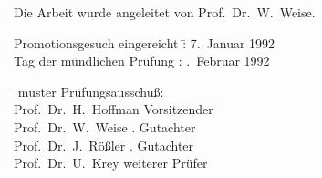 \vspace*{13cm}
Die Arbeit wurde angeleitet von Prof.~Dr.~W.~Weise.
\begin{tabbing}
Promotionsgesuch eingereicht   \= : \= 7.~Januar 1992\\
Tag der m\"undlichen Pr\"ufung \> : .~Februar 1992
\end{tabbing} 
\vspace*{2cm}
\begin{tabbing}
 \hspace*{3cm} \= \hspace{5cm} \= muster  \kill
    \> Pr\"ufungsausschu\ss :   \>   \\
    \> {\sc Prof.~Dr.~H.~Hoffman}              \> Vorsitzender  \\
    \> {\sc Prof.~Dr.~W.~Weise}         . Gutachter  \\
    \> {\sc Prof.~Dr.~J.~R\"o\ss ler}   . Gutachter  \\
    \> {\sc Prof.~Dr.~U.~Krey}              \> weiterer Pr\"ufer 
\end{tabbing}
